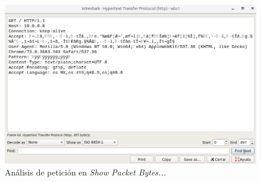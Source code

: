 \documentclass[12pt, a4paper, titlepage]{report}
\begin{document}
        	\begin{figure}[H]
        		\begin{center}	\includegraphics[width=13cm]{./imagenes/Desarrollo/Componente_1/Version1/wiresharkFrame_ISO_header.jpeg}
        			\caption{Análisis de petición en \textit{Show Packet Bytes...}}
        			\label{fig:analisisPeticion}
        		\end{center}
        	\end{figure}
        	
	\newpage
\end{document}
